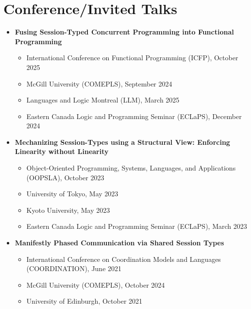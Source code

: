\documentclass[11pt]{article}
\begin{document}
\section*{Conference/Invited Talks}
\begin{itemize}[leftmargin=*]
    \item \textbf{Fusing Session-Typed Concurrent Programming into Functional Programming}
    \begin{itemize}
        \item International Conference on Functional Programming (ICFP), October 2025
        \item McGill University (COMEPLS), September 2024
        \item Languages and Logic Montreal (LLM), March 2025
        \item Eastern Canada Logic and Programming Seminar (ECLaPS), December 2024
    \end{itemize}

    \item \textbf{Mechanizing Session-Types using a Structural View: Enforcing Linearity without Linearity}
    \begin{itemize}
        \item Object-Oriented Programming, Systems, Languages, and Applications (OOPSLA), October 2023
        \item University of Tokyo, May 2023
        \item Kyoto University, May 2023
        \item Eastern Canada Logic and Programming Seminar (ECLaPS), March 2023
    \end{itemize}

    \item \textbf{Manifestly Phased Communication via Shared Session Types}
    \begin{itemize}
      \item International Conference on Coordination Models and Languages (COORDINATION), June 2021
        \item McGill University (COMEPLS), October 2024
        \item University of Edinburgh, October 2021
    \end{itemize}

\end{itemize}
\end{document}
